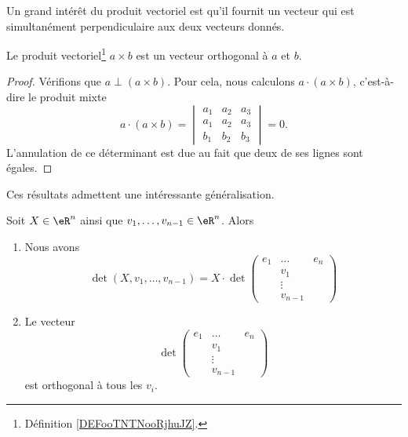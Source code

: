 Un grand intérêt du produit vectoriel est qu'il fournit un vecteur qui est simultanément perpendiculaire aux deux vecteurs donnés.
\begin{proposition}     \label{PROPooTUVKooOQXKKl}
	Le produit vectoriel\footnote{Définition \ref{DEFooTNTNooRjhuJZ}.} \( a\times b\) est un vecteur orthogonal à \( a\) et \( b\).
\end{proposition}

\begin{proof}
	Vérifions que \( a\perp (a\times b)\). Pour cela, nous calculons \( a\cdot (a\times b)\), c'est-à-dire le produit mixte
	\begin{equation}
		a\cdot(a\times b)=\begin{vmatrix}
			a_1 & a_2 & a_3 \\
			a_1 & a_2 & a_3 \\
			b_1 & b_2 & b_3
		\end{vmatrix}=0.
	\end{equation}
	L'annulation de ce déterminant est due au fait que deux de ses lignes sont égales.
\end{proof}

Ces résultats admettent une intéressante généralisation.
\begin{lemma}       \label{LEMooFRWKooVloCSM}
	Soit \( X\in \eR^n\) ainsi que \( v_1,\ldots, v_{n-1}\in \eR^n\). Alors
	\begin{enumerate}
		\item
		      Nous avons
		      \begin{equation}        \label{EQooMQNPooRHHBjz}
			      \det(X,v_1,\ldots, v_{n-1})=X\cdot
			      \det\begin{pmatrix}
				      e_1 & \ldots  & e_n \\
				          & v_1     &     \\
				          & \vdots  &     \\
				          & v_{n-1} &
			      \end{pmatrix}
		      \end{equation}
		\item
		      Le vecteur
		      \begin{equation}
			      \det\begin{pmatrix}
				      e_1 & \ldots  & e_n \\
				          & v_1     &     \\
				          & \vdots  &     \\
				          & v_{n-1} &
			      \end{pmatrix}
		      \end{equation}
		      est orthogonal à tous les \( v_i\).
	\end{enumerate}
\end{lemma}

